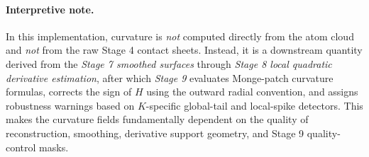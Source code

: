 \paragraph{Interpretive note.}
In this implementation, curvature is \emph{not} computed directly from the atom cloud and \emph{not} from the raw Stage 4 contact sheets. Instead, it is a downstream quantity derived from the \emph{Stage 7 smoothed surfaces} through \emph{Stage 8 local quadratic derivative estimation}, after which \emph{Stage 9} evaluates Monge-patch curvature formulas, corrects the sign of \(H\) using the outward radial convention, and assigns robustness warnings based on \(K\)-specific global-tail and local-spike detectors. This makes the curvature fields fundamentally dependent on the quality of reconstruction, smoothing, derivative support geometry, and Stage 9 quality-control masks.





